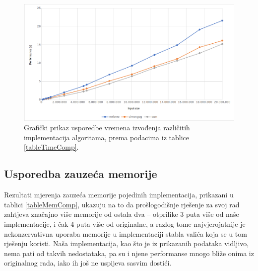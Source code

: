 \documentclass[a4paper,12pt]{article}
\begin{document}
\begin{figure}[h!]
	\begin{center}
		\includegraphics[width=\columnwidth]{timeGraph.png}
 		\caption{Grafički prikaz usporedbe vremena izvođenja različitih implementacija algoritama, prema podacima iz tablice \ref{tableTimeComp}.}
 		\label{fig:graphTime}
	\end{center}
\end{figure}


\clearpage
\subsection{Usporedba zauzeća memorije}

Rezultati mjerenja zauzeća memorije pojedinih implementacija, prikazani u tablici \ref{tableMemComp}, ukazuju na to da prošlogodišnje rješenje za svoj rad zahtjeva značajno više memorije od ostala dva -- otprilike 3 puta više od naše implementacije, i čak 4 puta više od originalne, a razlog tome najvjerojatnije je nekonzervativna uporaba memorije u implementaciji stabla valića koja se u tom rješenju koristi. Naša implementacija, kao što je iz prikazanih podataka vidljivo, nema pati od takvih nedostataka, pa su i njene performanse mnogo bliže onima iz originalnog rada, iako ih još ne uspijeva sasvim dostići.
\end{document}
